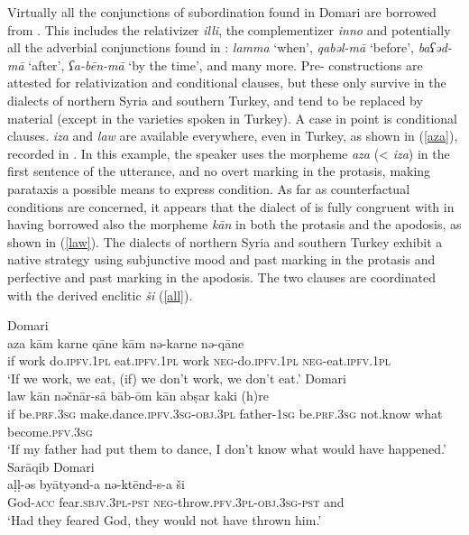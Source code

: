 \documentclass[output=paper]{langsci/langscibook}
\begin{document}
Virtually all the conjunctions of subordination found in Domari are borrowed from . This includes the {relativizer} \textit{illi}, the {complementizer} \textit{inno} and potentially all the adverbial conjunctions found in  : \textit{lamma} ‘when’, \textit{qabəl-mā} ‘before’, \textit{baʕəd-mā} ‘after’, \textit{ʕa-bēn-mā} ‘by the time’, and many more. Pre- constructions are attested for relativization and {conditional} clauses, but these only survive in the dialects of northern Syria and southern Turkey, and tend to be replaced by  material (except in the varieties spoken in Turkey). A case in point is {conditional} clauses.  \textit{iza} and \textit{law} are available everywhere, even in Turkey, as shown in (\ref{aza}), recorded in . In this example, the speaker uses the  morpheme \textit{aza} (< \textit{iza}) in the first sentence of the utterance, and no overt marking in the protasis, making parataxis a possible means to express condition. As far as counterfactual conditions are concerned, it appears that the dialect of  is fully congruent with  in having borrowed also the morpheme \textit{kān} in both the protasis and the apodosis, as shown in (\ref{law}). The dialects of northern Syria and southern Turkey exhibit a native strategy using subjunctive mood and past marking in the protasis and perfective and past marking in the apodosis. The two clauses are coordinated with the  derived enclitic \textit{ši} (\ref{all}).

\ea \label{aza}
{ Domari}\\
\gll aza kām karne qāne kām nə-karne nə-qāne\\
     if work do.\textsc{ipfv.1pl} eat.\textsc{ipfv.1pl} work \textsc{neg}{}-do.\textsc{ipfv.1pl} \textsc{neg}{}-eat.\textsc{ipfv.1pl}\\
\glt ‘If we work, we eat, (if) we don’t work, we don’t eat.’
\ex \label{law}
{ Domari}\\
\gll law kān nəčnār-sā bāb-ōm kān abṣar kaki (h)re\\
     if be.\textsc{prf.3sg} make.dance\textsc{.ipfv.3sg-obj.3pl} father-\textsc{1sg} be.\textsc{prf.3sg} not.know what become.\textsc{pfv.3sg}\\
\glt ‘If my father had put them to dance, I don’t know what would have happened.’
\ex \label{all}
{Sarāqib Domari}\\
\gll aḷḷ-əs byātyənd-a nə-ktēnd-s-a ši\\
     God-\textsc{acc} fear.\textsc{sbjv.3pl}{}-\textsc{pst} \textsc{neg}{}-throw.\textsc{pfv.3pl-obj.3sg-pst} and\\
\glt ‘Had they feared God, they would not have thrown him.’
\z
\end{document}
